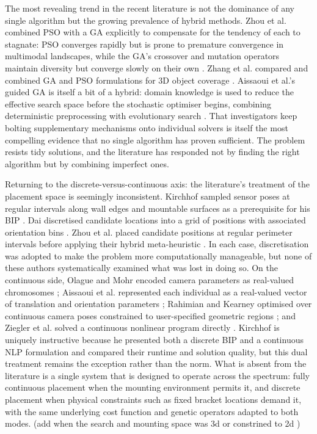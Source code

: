 The most revealing trend in the recent literature is not the dominance of any single algorithm but the growing prevalence of hybrid methods. Zhou et al. combined \gls{PSO} with a \gls{GA} explicitly to compensate for the tendency of each to stagnate: \gls{PSO} converges rapidly but is prone to premature convergence in multimodal landscapes, while the \gls{GA}'s crossover and mutation operators maintain diversity but converge slowly on their own \parencite{zhouSensorPlacementOptimization2024}. Zhang et al. compared and combined \gls{GA} and \gls{PSO} formulations for 3D object coverage \parencite{zhangCoverageOptimizationVisual2019}. Aissaoui et al.'s guided \gls{GA} is itself a bit of a hybrid: domain knowledge is used to reduce the effective search space before the stochastic optimiser begins, combining deterministic preprocessing with evolutionary search \parencite{aissaouiDesigningCameraPlacement2018}. That investigators keep bolting supplementary mechanisms onto individual solvers is itself the most compelling evidence that no single algorithm has proven sufficient. The problem resists tidy solutions, and the literature has responded not by finding the right algorithm but by combining imperfect ones.


Returning to the discrete-versus-continuous axis: the literature's treatment of the placement space is seemingly inconsistent. Kirchhof sampled sensor poses at regular intervals along wall edges and mountable surfaces as a prerequisite for his \gls{BIP} \parencite{kirchhofOptimalPlacementMultiple2013}. Dai discretised candidate locations into a grid of positions with associated orientation bins \parencite{daiOptimalCameraConfiguration}. Zhou et al. placed candidate positions at regular perimeter intervals before applying their hybrid meta-heuristic \parencite{zhouSensorPlacementOptimization2024}. In each case, discretisation was adopted to make the problem more computationally manageable, but none of these authors systematically examined what was lost in doing so. On the continuous side, Olague and Mohr encoded camera parameters as real-valued chromosomes \parencite{olagueOptimalCameraPlacement2002}; Aissaoui et al. represented each individual as a real-valued vector of translation and orientation parameters \parencite{aissaouiDesigningCameraPlacement2018}; Rahimian and Kearney optimised over continuous camera poses constrained to user-specified geometric regions \parencite{rahimianOptimalCameraPlacement2017}; and Ziegler et al. solved a continuous nonlinear program directly \parencite{zieglerOptimalCameraPlacement2023}. Kirchhof is uniquely instructive because he presented both a discrete \gls{BIP} and a continuous NLP formulation and compared their runtime and solution quality, but this dual treatment remains the exception rather than the norm. What is absent from the literature is a single system that is designed to operate across the spectrum: fully continuous placement when the mounting environment permits it, and discrete placement when physical constraints such as fixed bracket locations demand it, with the same underlying cost function and genetic operators adapted to both modes. (add when the search and mounting space was 3d or constrined to 2d )

